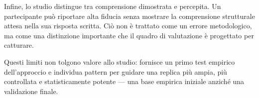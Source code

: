 Infine, lo studio distingue tra comprensione dimostrata e percepita. Un partecipante può riportare alta fiducia senza mostrare la comprensione strutturale attesa nella sua risposta scritta. Ciò non è trattato come un errore metodologico, ma come una distinzione importante che il quadro di valutazione è progettato per catturare.

Questi limiti non tolgono valore allo studio: fornisce un primo test empirico dell'approccio e individua pattern per guidare una replica più ampia, più controllata e statisticamente potente --- una base empirica iniziale anziché una validazione finale.
